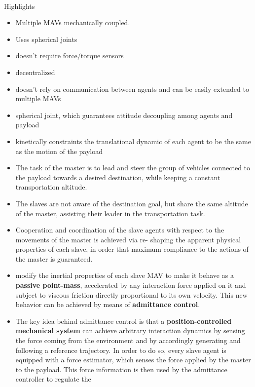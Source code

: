 \documentclass{article}
\begin{document}
		\paragraph{\cite{tagliabue-2017-robust-collaborative-object-transportation-using-multiple-mavs}}
		Highlights
		\begin{itemize}
			\item Multiple MAVs mechanically coupled.
			\item Uses spherical joints
			\item doesn’t require force/torque sensors
			\item decentralized
			\item doesn’t rely on communication between agents and can be easily extended to multiple MAVs
			\item  spherical joint, which guarantees attitude decoupling among agents and payload
			\item kinetically constraints the translational dynamic of each agent to be the same as the motion of the payload
			\item The task of the master is to lead and steer the group of vehicles connected to the payload towards a desired destination, while keeping a constant transportation altitude.
			\item The slaves are not aware of the destination goal, but share the same altitude of the master, assisting their leader in the transportation task.
			\item  Cooperation and coordination of the slave agents with respect to the movements of the master is achieved via re-
			shaping the apparent physical properties of each slave, in order that maximum compliance to the actions of the master is guaranteed.
			\item modify the inertial properties of each slave MAV to make it behave as a \textbf{passive point-mass},
			accelerated by any interaction force applied on it and subject to viscous friction directly proportional to its own velocity. This new behavior can be achieved by means of \textbf{admittance control}.
			\item The key idea behind admittance control is that a \textbf{position-controlled mechanical system} can achieve arbitrary
			interaction dynamics by sensing the force coming from the environment and by accordingly generating and following
			a reference trajectory. In order to do so, every slave agent is equipped with a force estimator, which senses the force
			applied by the master to the payload. This force information is then used by the admittance controller to regulate the

\end{itemize}
\end{document}
